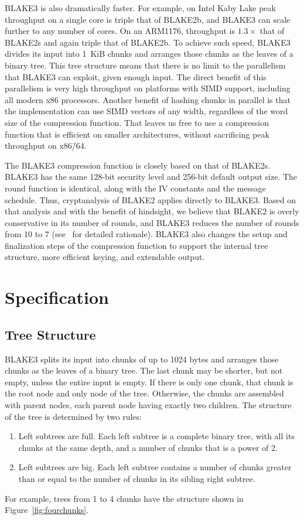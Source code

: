 \documentclass[11pt,notitlepage,a4paper]{article}
\begin{document}
BLAKE3 is also dramatically faster.
For example, on Intel Kaby Lake peak throughput on a single core is triple
that of BLAKE2b, and BLAKE3 can scale further to any number of cores. On an
ARM1176, throughput is $1.3\times$ that of BLAKE2s and again triple that of
BLAKE2b.
To achieve such speed, BLAKE3 divides its input into 1~KiB chunks and
arranges those chunks as the leaves of a binary tree. 
This tree structure means that there is no limit to the parallelism that
BLAKE3 can exploit, given enough input. 
The direct benefit of this parallelism is very high throughput on
platforms with SIMD support, including all modern x86 processors.
Another benefit of hashing chunks in parallel is that the implementation
can use SIMD vectors of any width, regardless of the word size of the
compression function. 
That leaves us free to use a compression function that is efficient on
smaller architectures, without sacrificing peak throughput on x86\=/64.

The BLAKE3 compression function is closely based on that of BLAKE2s.
BLAKE3 has the same 128-bit security level and 256-bit default output
size. The round function is identical, along with the IV constants and
the message schedule. Thus, cryptanalysis of BLAKE2 applies directly to
BLAKE3. Based on that analysis and with the benefit of hindsight, we
believe that BLAKE2 is overly conservative in its number of rounds, and
BLAKE3 reduces the number of rounds from 10 to 7 (see~\cite{TMC} for
detailed rationale).
BLAKE3 also changes the setup and finalization steps of the compression
function to support the internal tree structure, more efficient keying,
and extendable output.

\section{Specification}\label{sec:specification}

\subsection{Tree Structure}\label{sec:tree}

BLAKE3 splits its input into chunks of up to 1024 bytes and arranges those
chunks as the leaves of a binary tree. The last chunk may be shorter, but not
empty, unless the entire input is empty. If there is only one chunk, that chunk
is the root node and only node of the tree. Otherwise, the chunks are assembled
with parent nodes, each parent node having exactly two children. The
structure of the tree is determined by two rules:
\begin{enumerate}
    \item Left subtrees are full. Each left subtree is a complete binary tree,
        with all its chunks at the same depth, and a number of chunks that is a
        power of 2.
    \item Left subtrees are big. Each left subtree contains a number of chunks
        greater than or equal to the number of chunks in its sibling right
        subtree.
\end{enumerate}
For example, trees from 1 to 4 chunks have the structure shown in
Figure~\ref{fig:fourchunks}.
\end{document}
